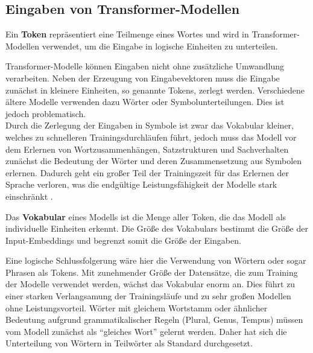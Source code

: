 
\subsection{Eingaben von Transformer-Modellen}
\begin{definition}\label{def:token}
    Ein \textbf{Token} repräsentiert eine Teilmenge eines Wortes und wird in Transformer-Modellen verwendet, um die Eingabe in logische Einheiten zu unterteilen.
\end{definition}
Transformer-Modelle können Eingaben nicht ohne zusätzliche Umwandlung verarbeiten.
Neben der Erzeugung von Eingabevektoren muss die Eingabe zunächst in kleinere Einheiten, so genannte Tokens, zerlegt werden.
Verschiedene ältere Modelle verwenden dazu Wörter oder Symbolunterteilungen.
Dies ist jedoch problematisch.\\

Durch die Zerlegung der Eingaben in Symbole ist zwar das Vokabular kleiner, welches zu schnelleren Trainingsdurchläufen führt, jedoch muss das Modell vor dem Erlernen von Wortzusammenhängen, Satzstrukturen und Sachverhalten zunächst die Bedeutung der Wörter und deren Zusammensetzung aus Symbolen erlernen.
Dadurch geht ein großer Teil der Trainingszeit für das Erlernen der Sprache verloren, was die endgültige Leistungsfähigkeit der Modelle stark einschränkt \citep{bpe}.\\

\begin{definition}\label{def:vokabular}
    Das \textbf{Vokabular} eines Modells ist die Menge aller Token, die das Modell als individuelle Einheiten erkennt. Die Größe des Vokabulars bestimmt die Größe der Input-Embeddings und begrenzt somit die Größe der Eingaben.
\end{definition}

Eine logische Schlussfolgerung wäre hier die Verwendung von Wörtern oder sogar Phrasen als Tokens.
Mit zunehmender Größe der Datensätze, die zum Training der Modelle verwendet werden, wächst das Vokabular enorm an.
Dies führt zu einer starken Verlangsamung der Trainingsläufe und zu sehr großen Modellen ohne Leistungsvorteil.
Wörter mit gleichem Wortstamm oder ähnlicher Bedeutung aufgrund grammatikalischer Regeln (Plural, Genus, Tempus) müssen vom Modell zunächst als \enquote{gleiches Wort} gelernt werden.
Daher hat sich die Unterteilung von Wörtern in Teilwörter als Standard durchgesetzt.

